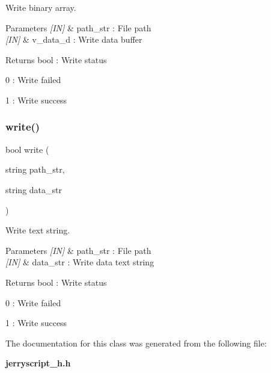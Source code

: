 Write binary array. 


\begin{DoxyCode}{0}
\end{DoxyCode}



\begin{DoxyParams}{Parameters}
{\em \mbox{[}\+I\+N\mbox{]}} & path\+\_\+str \+: File path \\
\hline
{\em \mbox{[}\+I\+N\mbox{]}} & v\+\_\+data\+\_\+d \+: Write data buffer \\
\hline
\end{DoxyParams}
\begin{DoxyReturn}{Returns}
bool \+: Write status \begin{DoxyItemize}
\item 0 \+: Write failed \item 1 \+: Write success \end{DoxyItemize}

\end{DoxyReturn}
\mbox{\label{classfile_a66dabb055fac6400295f47d855d74b31}} 
\subsubsection{write()\hspace{0.1cm}{\footnotesize\ttfamily [2/2]}}
{\footnotesize\ttfamily bool write (\begin{DoxyParamCaption}\item[{string}]{path\+\_\+str,  }\item[{string}]{data\+\_\+str }\end{DoxyParamCaption})}



Write text string. 


\begin{DoxyCode}{0}
\end{DoxyCode}



\begin{DoxyParams}{Parameters}
{\em \mbox{[}\+I\+N\mbox{]}} & path\+\_\+str \+: File path \\
\hline
{\em \mbox{[}\+I\+N\mbox{]}} & data\+\_\+str \+: Write data text string \\
\hline
\end{DoxyParams}
\begin{DoxyReturn}{Returns}
bool \+: Write status \begin{DoxyItemize}
\item 0 \+: Write failed \item 1 \+: Write success \end{DoxyItemize}

\end{DoxyReturn}


The documentation for this class was generated from the following file\+:\begin{DoxyCompactItemize}
\item 
\textbf{ jerryscript\+\_\+h.\+h}\end{DoxyCompactItemize}
